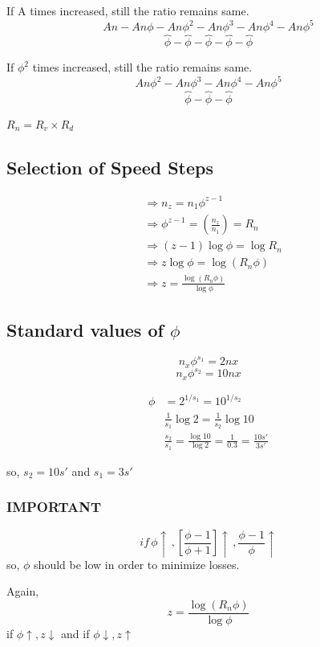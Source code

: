 \documentclass{article}
\begin{document}
If A times increased, still the ratio remains same. 
$$An - An\phi - An\phi^2 - An\phi^3 - An\phi^4 - An\phi^5$$
$$\overbrace{\phi} - \overbrace{\phi} - \overbrace{\phi} - \overbrace{\phi} - \overbrace{\phi}$$

If $\phi^2$ times increased, still the ratio remains same. 
$$An\phi^2 - An\phi^3 - An\phi^4 - An\phi^5$$
$$\overbrace{\phi} - \overbrace{\phi} - \overbrace{\phi} $$

$R_n = R_v \times R_d$

\subsection*{Selection of Speed Steps}
\begin{align*}
  &\Rightarrow n_z = n_1 \phi^{z-1} \\
  &\Rightarrow \phi^{z-1} = \left(\frac{n_z}{n_1}\right) = R_n \\
  &\Rightarrow (z-1) \log \phi = \log R_n \\
  &\Rightarrow z \log \phi = \log \left(R_n \phi\right) \\
  &\Rightarrow z = \frac{\log \left(R_n \phi\right)}{\log \phi} 
\end{align*}

\subsection*{Standard values of $\phi$}
$$n_x \phi^{s_1} = 2nx$$
$$n_x \phi^{s_2} = 10nx$$

\begin{align*}
  \phi &= 2^{1/s_1} = 10^{1/s_2} \\
  &\frac{1}{s_1} \log 2 = \frac{1}{s_2} \log 10 \\
  &\frac{s_2}{s_1} = \frac{\log 10}{\log 2} = \frac{1}{0.3} = \frac{10 s'}{3s'}  
\end{align*}

so, $s_2 = 10s'$ and $s_1 = 3s'$ 
\subsubsection*{IMPORTANT}
$$if \, \phi \uparrow \, , \left[\frac{\phi - 1}{\phi + 1}\right] \uparrow \, , \frac{\phi -1}{\phi} \uparrow $$ 
so, $\phi$ should be low in order to minimize losses. 

Again, $$z = \frac{\log \left(R_n \phi\right)}{\log \phi}$$
if $\phi \uparrow , z \downarrow $ and if $\phi \downarrow , z \uparrow $
\end{document}
